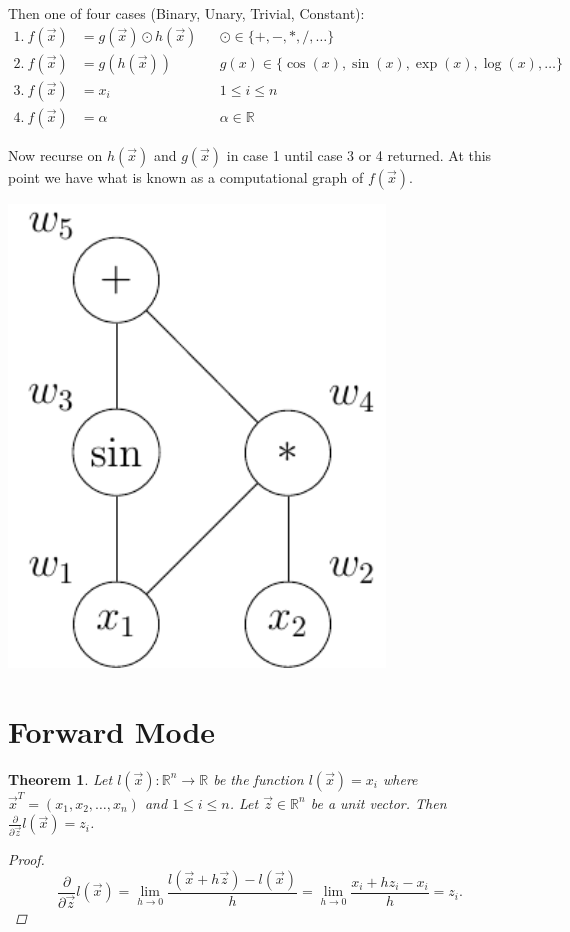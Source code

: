 \documentclass[a0,landscape]{a0poster}
\newtheorem{thm}{Theorem}
\begin{document}
\begin{multicols}{4}
    Then one of four cases (Binary, Unary, Trivial, Constant):
\begin{align*}
    1.\ f(\vec{x})&=g(\vec{x})\odot h(\vec{x}) &&\odot\in\{+,-,*,/,\dots\} \\
    2.\ f(\vec{x})&=g(h(\vec{x})) &&g(x)\in\{\cos{(x)},\sin{(x)},\exp{(x)},\log{(x)},\dots\} \\
    3.\ f(\vec{x})&=x_i &&1\leq i\leq n \\
    4.\ f(\vec{x})&=\alpha &&\alpha\in\mathbb{R}
\end{align*}

Now recurse on $h(\vec{x})$ and $g(\vec{x})$ in case 1 until case 3 or 4 returned.
At this point we have what is known as a computational graph of $f(\vec{x})$.

\begin{center}
    \includegraphics[width=100mm]{figures/comp_graph.pdf}
\end{center}

    \section*{Forward Mode}
\begin{thm}
    Let $l(\vec{x}):\mathbb{R}^n\rightarrow\mathbb{R}$ be the function $l(\vec{x})=x_i$ where $\vec{x}^T=(x_1,x_2,\dots,x_n)$ and $1\leq i\leq n$.
    Let $\vec{z}\in\mathbb{R}^n$ be a unit vector. 
    Then $\frac{\partial}{\partial\vec{z}}l(\vec{x})=z_i$.
    \begin{proof}
        $$\frac{\partial}{\partial\vec{z}}l(\vec{x})=\lim_{h\rightarrow0}\frac{l(\vec{x} + h\vec{z}) - l(\vec{x})}{h}=\lim_{h\rightarrow0}\frac{x_i + hz_i - x_i}{h}=z_i.$$
    \end{proof}
\end{thm}


\end{multicols}
\end{document}
